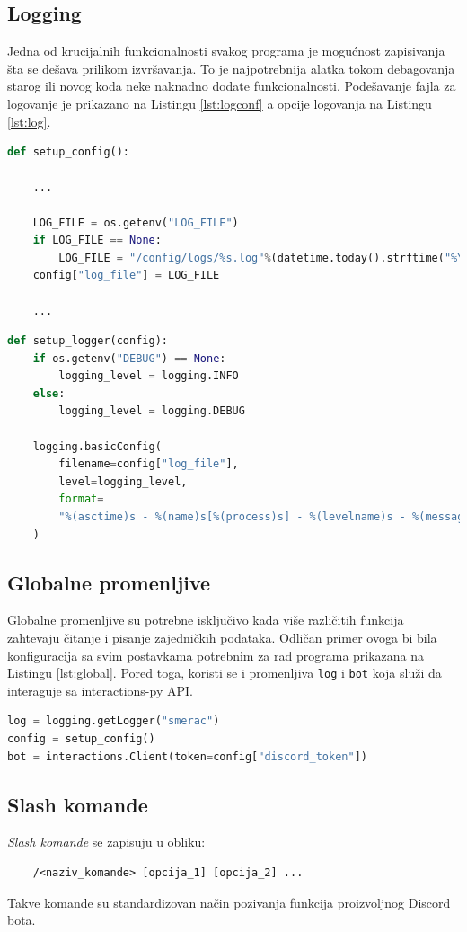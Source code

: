 \documentclass[a4paper,11pt]{article}
\begin{document}
\subsection{Logging}
Jedna od krucijalnih funkcionalnosti svakog programa je mogućnost zapisivanja šta se dešava prilikom izvršavanja. To je najpotrebnija alatka tokom debagovanja starog ili novog koda neke naknadno dodate funkcionalnosti. Podešavanje fajla za logovanje je prikazano na Listingu \ref{lst:logconf} a opcije logovanja na Listingu \ref{lst:log}.
\begin{lstlisting}[language=Python, caption=Podešavanje fajla za logovanje, label=lst:logconf]
def setup_config():
    
    ...

    LOG_FILE = os.getenv("LOG_FILE")
    if LOG_FILE == None:
        LOG_FILE = "/config/logs/%s.log"%(datetime.today().strftime("%Y-%m-%d-%H-%M-%S"))
    config["log_file"] = LOG_FILE
    
    ...
\end{lstlisting}
\begin{lstlisting}[language=Python, caption=Opcije loga, label=lst:log]
def setup_logger(config):
    if os.getenv("DEBUG") == None:
        logging_level = logging.INFO
    else:
        logging_level = logging.DEBUG

    logging.basicConfig(
        filename=config["log_file"],
        level=logging_level,
        format=
        "%(asctime)s - %(name)s[%(process)s] - %(levelname)s - %(message)s",
    )
\end{lstlisting}
\subsection{Globalne promenljive}
Globalne promenljive su potrebne isključivo kada više različitih funkcija zahtevaju čitanje i pisanje zajedničkih podataka. Odličan primer ovoga bi bila konfiguracija sa svim postavkama potrebnim za rad programa prikazana na Listingu \ref{lst:global}. Pored toga, koristi se i promenljiva \texttt{log} i \texttt{bot} koja služi da interaguje sa interactions-py API.
\begin{lstlisting}[language=Python, caption=Globalne promenljive, label=lst:global]
log = logging.getLogger("smerac")
config = setup_config()
bot = interactions.Client(token=config["discord_token"])
\end{lstlisting}
\newpage
\subsection{Slash komande}
\textit{Slash komande} se zapisuju u obliku:
\begin{verbatim}
    /<naziv_komande> [opcija_1] [opcija_2] ...
\end{verbatim}
Takve komande su standardizovan način pozivanja funkcija proizvoljnog Discord bota.
\end{document}
